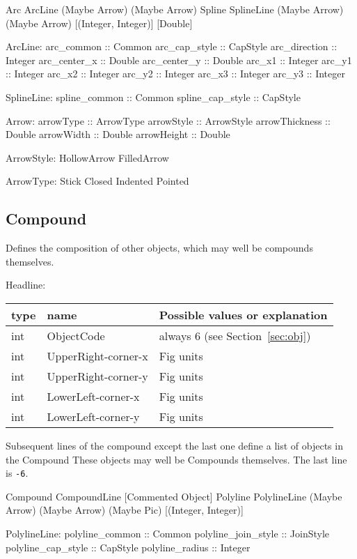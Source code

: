 \documentclass[10pt, a4paper]{article}
\begin{document}
Arc ArcLine (Maybe Arrow) (Maybe Arrow)	 
Spline SplineLine (Maybe Arrow) (Maybe Arrow) [(Integer, Integer)] [Double]

ArcLine:
arc\_common :: Common
arc\_cap\_style :: CapStyle
arc\_direction :: Integer
arc\_center\_x :: Double
arc\_center\_y :: Double
arc\_x1 :: Integer
arc\_y1 :: Integer
arc\_x2 :: Integer
arc\_y2 :: Integer
arc\_x3 :: Integer
arc\_y3 :: Integer

SplineLine:
spline\_common :: Common
spline\_cap\_style :: CapStyle

Arrow:
arrowType :: ArrowType
arrowStyle :: ArrowStyle
arrowThickness :: Double
arrowWidth :: Double
arrowHeight :: Double


ArrowStyle:
HollowArrow	 
FilledArrow	 


ArrowType:
Stick	 
Closed	 
Indented	 
Pointed	 


 
\subsection{Compound}\label{subsec:compound}

Defines the composition of other objects, 
which may well be compounds themselves. 

\noindent
Headline: \\
%
\begin{tabular}{|lll|}
\hline
type & name & Possible values or explanation \\
\hline
\hline
int & ObjectCode             & always 6 (see Section~\ref{sec:obj}) \\
int & UpperRight-corner-x     & Fig units \\
int & UpperRight-corner-y     & Fig units \\
int & LowerLeft-corner-x      & Fig units \\
int & LowerLeft-corner-y      & Fig units \\
\hline
\end{tabular}

Subsequent lines of the compound except the last one 
define a list of objects in the Compound
These objects may well be Compounds themselves. 
The last line is {\tt-6}. 

Compound CompoundLine [Commented Object]	 
Polyline PolylineLine (Maybe Arrow) (Maybe Arrow) (Maybe Pic) [(Integer, Integer)]	 



PolylineLine:
polyline\_common :: Common
polyline\_join\_style :: JoinStyle
polyline\_cap\_style :: CapStyle
polyline\_radius :: Integer
\end{document}
